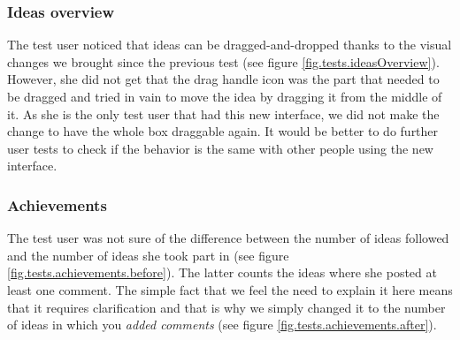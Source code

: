 \documentclass[a4paper,12pt,twoside]{article}
\begin{document}
\subsubsection*{Ideas overview}
The test user noticed that ideas can be dragged-and-dropped thanks to the visual changes we brought since the previous test (see figure \ref{fig.tests.ideasOverview}).
However, she did not get that the drag handle icon was the part that needed to be dragged and tried in vain to move the idea by dragging it from the middle of it.
As she is the only test user that had this new interface, we did not make the change to have the whole box draggable again.
It would be better to do further user tests to check if the behavior is the same with other people using the new interface.

\subsubsection*{Achievements}
The test user was not sure of the difference between the number of ideas followed and the number of ideas she took part in (see figure \ref{fig.tests.achievements.before}).
The latter counts the ideas where she posted at least one comment.
The simple fact that we feel the need to explain it here means that it requires clarification and that is why we simply changed it to the number of ideas in which you \emph{added comments} (see figure \ref{fig.tests.achievements.after}).
\end{document}
